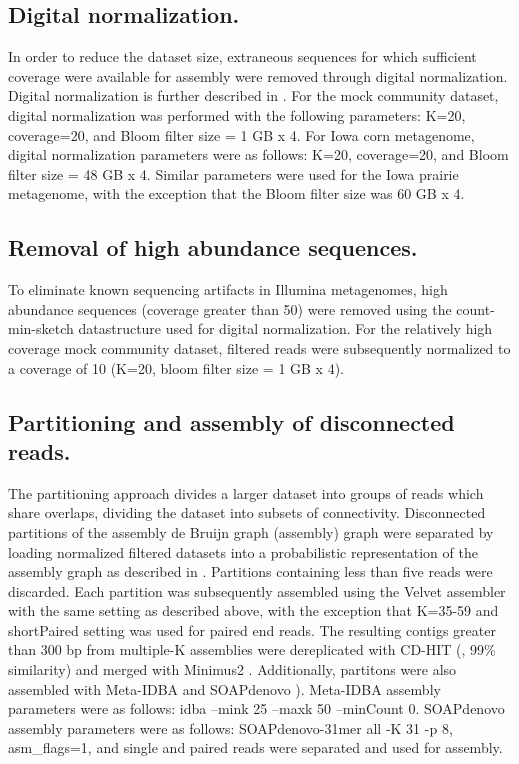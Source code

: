 \documentclass{pnastwo}
\begin{document}
\begin{article}
\subsection*{Digital normalization.}
In order to reduce the dataset size, extraneous sequences for which sufficient coverage were available for assembly  were removed through digital normalization.  Digital normalization is further described in \cite{browndiginorm}.  
For the mock community dataset, digital normalization was performed with the
following parameters: K=20, coverage=20, and Bloom filter size = 1 GB
x 4.  For Iowa corn metagenome, digital normalization parameters were
as follows: K=20, coverage=20, and Bloom filter size = 48 GB x 4.
Similar parameters were used for the Iowa prairie metagenome, with the
exception that the Bloom filter size was 60 GB x 4.

\subsection*{Removal of high abundance sequences.}
To eliminate known sequencing artifacts in Illumina metagenomes, high abundance 
sequences (coverage
greater than 50) were removed using the count-min-sketch datastructure
used for digital normalization.  For the relatively high coverage mock
community dataset, filtered reads were subsequently normalized to a
coverage of 10 (K=20, bloom filter size = 1 GB x 4).

\subsection*{Partitioning and assembly of disconnected reads.}
The partitioning approach divides a larger dataset into groups of reads which share overlaps, dividing the dataset into subsets of connectivity.  Disconnected partitions of the assembly de Bruijn graph (assembly) graph were separated by loading normalized filtered datasets into a probabilistic
representation of the assembly graph as described in \cite{Pell:2012cq}.
Partitions containing less than five reads were discarded.  Each
partition was subsequently assembled using the Velvet assembler with
the same setting as described above, with the exception that K=35-59
and shortPaired setting was used for paired end reads.  The resulting
contigs greater than 300 bp from multiple-K assemblies were
dereplicated with CD-HIT (\cite{Fu:2012jk}, 99\% similarity) and merged with
Minimus2 \cite{Sommer:2007p1253}.   Additionally, partitons were also assembled with 
Meta-IDBA \cite{Peng:2011p898} and SOAPdenovo \cite{Li:2010jz}).  Meta-IDBA assembly parameters were as follows:  idba --mink 25 --maxk 50 --minCount 0.  SOAPdenovo assembly parameters were as follows:  SOAPdenovo-31mer all -K 31 -p 8, asm\_flags=1, and single and paired reads were separated and used for assembly.


\end{article}
\end{document}
